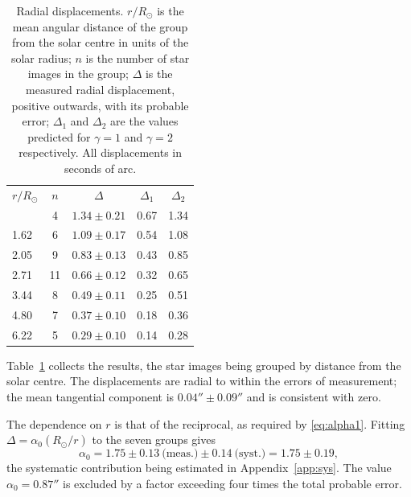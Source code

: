 \documentclass[aps,prd,reprint,amsmath,amssymb,nofootinbib,longbibliography]{revtex4-2}
\begin{document}
\begin{table}[t]
\caption{Radial displacements. $r/R_\odot$ is the mean angular distance of the group from the solar
centre in units of the solar radius; $n$ is the number of star images in the group;
$\Delta$ is the measured radial displacement, positive outwards, with its probable error;
$\Delta_1$ and $\Delta_2$ are the values predicted for $\gamma=1$ and $\gamma=2$ respectively.
All displacements in seconds of arc.}
\label{tab:defl}
\begin{ruledtabular}
\begin{tabular}{lcccc}
$r/R_\odot$ & $n$ & $\Delta$ & $\Delta_1$ & $\Delta_2$ \\
\colrule
1.31 &  4 & $1.34 \pm 0.21$ & 0.67 & 1.34 \\
1.62 &  6 & $1.09 \pm 0.17$ & 0.54 & 1.08 \\
2.05 &  9 & $0.83 \pm 0.13$ & 0.43 & 0.85 \\
2.71 & 11 & $0.66 \pm 0.12$ & 0.32 & 0.65 \\
3.44 &  8 & $0.49 \pm 0.11$ & 0.25 & 0.51 \\
4.80 &  7 & $0.37 \pm 0.10$ & 0.18 & 0.36 \\
6.22 &  5 & $0.29 \pm 0.10$ & 0.14 & 0.28 \\
\end{tabular}
\end{ruledtabular}
\end{table}

Table~\ref{tab:defl} collects the results, the star images being grouped by distance from the solar
centre. The displacements are radial to within the errors of measurement; the mean tangential
component is $0.04'' \pm 0.09''$ and is consistent with zero.

The dependence on $r$ is that of the reciprocal, as required by \eqref{eq:alpha1}. Fitting
$\Delta = \alpha_0 (R_\odot/r)$ to the seven groups gives
\begin{equation}
\alpha_0 = 1.75 \pm 0.13\ \text{(meas.)} \pm 0.14\ \text{(syst.)} = 1.75 \pm 0.19 ,
\label{eq:alpha0}
\end{equation}
the systematic contribution being estimated in Appendix~\ref{app:sys}. The value
$\alpha_0 = 0.87''$ is excluded by a factor exceeding four times the total probable error.
\end{document}
